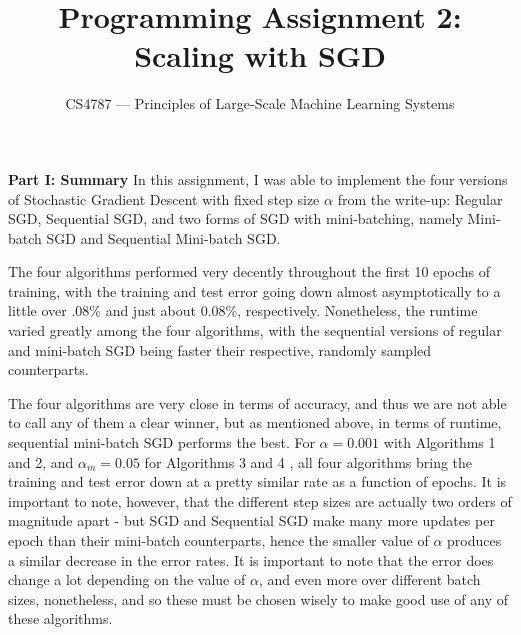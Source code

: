 \documentclass[10pt]{article}
\begin{document}
\nobibliography*

\title{Programming Assignment 2: Scaling with SGD}
\author{CS4787 --- Principles of Large-Scale Machine Learning Systems}
\date{}

\maketitle

\textbf{Part I: Summary}
In this assignment, I was able to implement the four versions of Stochastic Gradient Descent with fixed step size $\alpha$ from the write-up: Regular SGD, Sequential SGD, and two forms of SGD with mini-batching, namely Mini-batch SGD and Sequential Mini-batch SGD. 

The four algorithms performed very decently throughout the first 10 epochs of training, with the training and test error going down almost asymptotically to a little over .08\% and just about 0.08\%, respectively. Nonetheless, the runtime varied greatly among the four algorithms, with the sequential versions of regular and mini-batch SGD being faster their respective, randomly sampled counterparts.

The four algorithms are very close in terms of accuracy, and thus we are not able to call any of them a clear winner, but as mentioned above, in terms of runtime, sequential mini-batch SGD performs the best. For $\alpha = 0.001$ with Algorithms 1 and 2, and $\alpha_m = 0.05$ for Algorithms 3 and 4 , all four algorithms bring the training and test error down at a pretty similar rate as a function of epochs. It is important to note, however, that the different step sizes are actually two orders of magnitude apart - but SGD and Sequential SGD make many more updates per epoch than their mini-batch counterparts, hence the smaller value of $\alpha$ produces a similar decrease in the error rates. It is important to note that the error does change a lot depending on the value of $\alpha$, and even more over different batch sizes, nonetheless, and so these must be chosen wisely to make good use of any of these algorithms.
\end{document}
